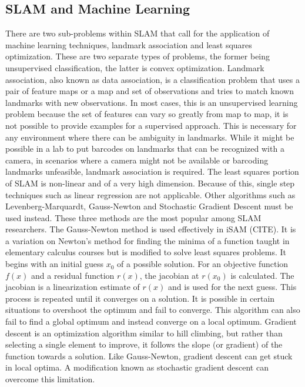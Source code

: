 \documentclass[12pt]{report}
\begin{document}
\subsection{SLAM and Machine Learning}
	There are two sub-problems within SLAM that call for the application of machine learning techniques, landmark association and least squares optimization.  These are two separate types of problems, the former being unsupervised classification, the latter is convex optimization.
Landmark association, also known as data association, is a classification problem that uses a pair of feature maps or a map and set of observations and tries to match known landmarks with new observations.  In most cases, this is an unsupervised learning problem because the set of features can vary so greatly from map to map, it is not possible to provide examples for a supervised approach.  This is necessary for any environment where there can be ambiguity in landmarks.  While it might be possible in a lab to put barcodes on landmarks that can be recognized with a camera, in scenarios where a camera might not be available or barcoding landmarks unfeasible, landmark association is required.
The least squares portion of SLAM is non-linear and of a very high dimension.  Because of this, single step techniques such as linear regression are not applicable.  Other algorithms such as Levenberg-Marquardt, Gauss-Newton and Stochastic Gradient Descent must be used instead.  These three methods are the most popular among SLAM researchers.  
	The Gauss-Newton method is used effectively in iSAM (CITE).  It is a variation on Newton’s method for finding the minima of a function taught in elementary calculus courses but is modified to solve least squares problems.  It begins with an initial guess $x_0$ of a possible solution.  For an objective function $f(x)$ and a residual function $r(x)$, the jacobian at $r(x_0)$ is calculated.  The jacobian is a linearization estimate of $r(x)$ and is used for the next guess.  This process is repeated until it converges on a solution.  It is possible in certain situations to overshoot the optimum and fail to converge.  This algorithm can also fail to find a global optimum and instead converge on a local optimum.
	Gradient descent is an optimization algorithm similar to hill climbing, but rather than selecting a single element to improve, it follows the slope (or gradient) of the function towards a solution.  Like Gauss-Newton, gradient descent can get stuck in local optima.  A modification known as stochastic gradient descent can overcome this limitation.  
\end{document}
